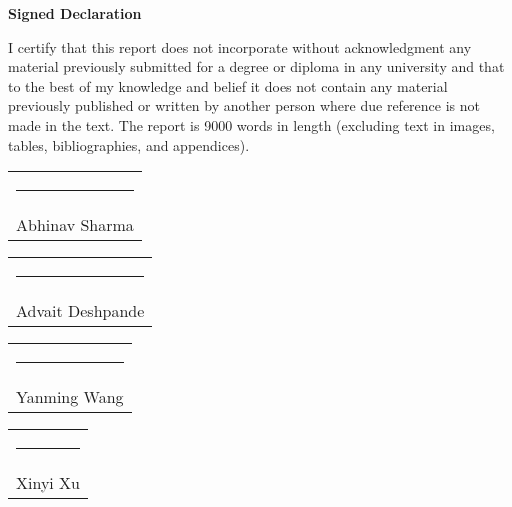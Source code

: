 \thispagestyle{empty}
\vspace*{\fill}
\begin{center}
    \textbf{Signed Declaration}
\end{center}

    I certify that this report does not incorporate without acknowledgment any material previously submitted for a degree or diploma in any university and that to the best of my knowledge and belief it does not contain any material previously published or written by another person where due reference is not made in the text. The report is 9000 words in length (excluding text in images, tables, bibliographies, and appendices).
    
\vspace*{4em}\noindent
\hfill%
\begin{tabular}[t]{c}
  \rule{10em}{0.4pt}\\ Abhinav Sharma
\end{tabular}%

    \vspace*{4em}\noindent
\hfill%
\begin{tabular}[t]{c}
  \rule{10em}{0.4pt}\\ Advait Deshpande
\end{tabular}%

    \vspace*{4em}\noindent
\hfill%
\begin{tabular}[t]{c}
  \rule{10em}{0.4pt} \\ Yanming Wang
\end{tabular}%

\vspace*{4em}\noindent
\hfill%
\begin{tabular}[t]{c}
  \rule{10em}{0.4pt}\\ Xinyi Xu
\end{tabular}%
    
\vspace*{\fill}
\pagebreak
